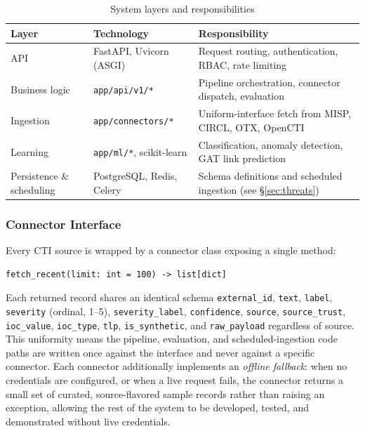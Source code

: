 \documentclass[conference]{IEEEtran}
\begin{document}
\begin{table}[h]
\caption{System layers and responsibilities}
\label{tab:architecture}
\centering
\begin{tabular}{@{}p{1.7cm}p{2.6cm}p{3.2cm}@{}}
\toprule
\textbf{Layer} & \textbf{Technology} & \textbf{Responsibility} \\
\midrule
API & FastAPI, Uvicorn (ASGI) & Request routing, authentication, RBAC, rate limiting \\
Business logic & \texttt{app/api/v1/*} & Pipeline orchestration, connector dispatch, evaluation \\
Ingestion & \texttt{app/connectors/*} & Uniform-interface fetch from MISP, CIRCL, OTX, OpenCTI \\
Learning & \texttt{app/ml/*}, scikit-learn & Classification, anomaly detection, GAT link prediction \\
Persistence \& scheduling & PostgreSQL, Redis, Celery & Schema definitions and scheduled ingestion (see \S\ref{sec:threats}) \\
\bottomrule
\end{tabular}
\end{table}

\subsubsection{Connector Interface}
\label{sec:connector-interface}
Every CTI source is wrapped by a connector class exposing a single method:
\begin{lstlisting}
fetch_recent(limit: int = 100) -> list[dict]
\end{lstlisting}
Each returned record shares an identical schema \textemdash{} \texttt{external\_id}, \texttt{text}, \texttt{label}, \texttt{severity} (ordinal, 1--5), \texttt{severity\_label}, \texttt{confidence}, \texttt{source}, \texttt{source\_trust}, \texttt{ioc\_value}, \texttt{ioc\_type}, \texttt{tlp}, \texttt{is\_synthetic}, and \texttt{raw\_payload} \textemdash{} regardless of source. This uniformity means the pipeline, evaluation, and scheduled-ingestion code paths are written once against the interface and never against a specific connector. Each connector additionally implements an \emph{offline fallback}: when no credentials are configured, or when a live request fails, the connector returns a small set of curated, source-flavored sample records rather than raising an exception, allowing the rest of the system to be developed, tested, and demonstrated without live credentials.
\end{document}

